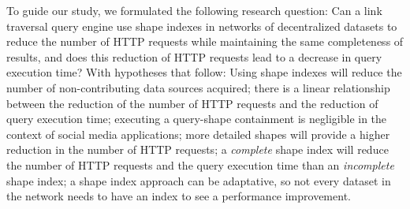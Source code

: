 To guide our study, we formulated the following research question:
Can a link traversal query engine use shape indexes in networks of decentralized datasets to reduce the number of HTTP requests while maintaining the same completeness of results, and does this reduction of HTTP requests lead to a decrease in query execution time?
With hypotheses that follow:
Using shape indexes will reduce the number of non-contributing data sources acquired;
there is a linear relationship between the reduction of the number of HTTP requests and the reduction of query execution time;
executing a query-shape containment is negligible in the context of social media applications; 
more detailed shapes will provide a higher reduction in the number of HTTP requests;
a \emph{complete} shape index will reduce the number of HTTP requests and the query execution time than an \emph{incomplete} shape index;
a shape index approach can be adaptative, so not every dataset in the network needs to have an index to see a performance improvement.
\iffalse
\pc{Started changing these to be more concrete by changing how to by how much or what. What do you think about that? More concrete or worse?}
By how much can this method reduce the ratio of dereferenced non-contributing data sources?
By how much do the fewer HTTP request affect the query execution time?
By how much does the level of detail of the shapes impact the performances?
What is the difference in performance between a \emph{complete} and an \emph{incomplete} shape index?
How does the ratio of subdomains containing an index influence global performances?
How does the fragmentation of the subdomain impact the performance?
How does the quantity of non-query contributing resources impact the performances?
What is the ideal query execution time if we only dereferenced contributing data sources?
\fi

